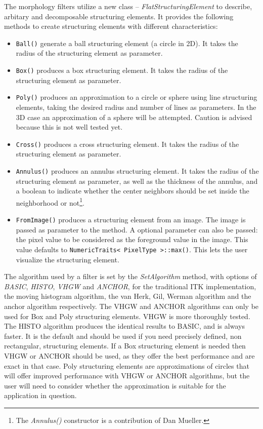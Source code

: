 \documentclass[a4paper]{InsightArticle}
\begin{document}
The morphology filters utilize a new class -- {\em
FlatStructuringElement} to describe, arbitary and decomposable
structuring elements. It provides the following methods to create
structuring elements with different characteristics:
\begin{itemize}
  \item \verb$Ball()$ generate a ball structuring element (a circle in 2D). It takes the 
	radius of the structuring element as parameter.
  \item \verb$Box()$ produces a box structuring element. It takes the radius 
	of the structuring element as parameter.
  \item \verb$Poly()$ produces an approximation to a circle or sphere using 
	line structuring elements, taking the desired radius and number of 
	lines as parameters. In the 3D case an approximation of a sphere will 
	be attempted. Caution is advised because this is not well tested yet.
  \item \verb$Cross()$ produces a cross structuring element. It takes the radius 
	of the structuring element as parameter.
  \item \verb$Annulus()$ produces an annulus structuring element. It takes the radius 
	of the structuring element as parameter, as well as the thickness of the annulus,
	and a boolean to indicate whether the center neighbors should be set inside the
	neighborhood or not\footnote{The {\em Annulus()} constructor  is a contribution
of Dan Mueller.}.
  \item \verb$FromImage()$ produces a structuring element from an image. The image is passed
as parameter to the method. A optional parameter can also be passed: the pixel value
to be considered as the foreground value in the image. This value defaults to
\verb$NumericTraits< PixelType >::max()$. This lets the user visualize the structuring element.
\end{itemize}

The algorithm used by a filter is set by the {\em SetAlgorithm}
method, with options of {\em BASIC}, {\em HISTO}, {\em VHGW} and {\em
ANCHOR}, for the traditional ITK implementation, the moving histogram
algorithm, the van Herk, Gil, Werman algorithm and the anchor
algorithm respectively. The VHGW and ANCHOR algorithms can only be
used for Box and Poly structuring elements. VHGW is more thoroughly
tested. The HISTO algorithm produces the identical results to BASIC,
and is always faster. It is the default and should be used if you need
precisely defined, non rectangular, structuring elements. If a Box
structuring element is needed then VHGW or ANCHOR should be used, as
they offer the best performance and are exact in that case. Poly
structuring elements are approximations of circles that will offer
improved performance with VHGW or ANCHOR algorithms, but the user will
need to consider whether the approximation is suitable for the
application in question.
\end{document}
